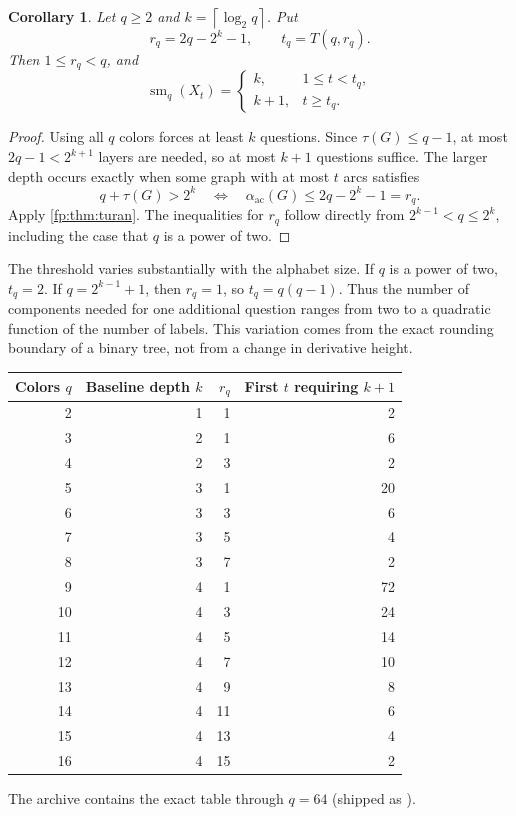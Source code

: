 \documentclass[11pt,letterpaper]{article}
\numberwithin{equation}{section}
\newtheorem{corollary}[corollary]{Corollary}
\theoremstyle{definition}
\theoremstyle{remark}
\theoremstyle{definition}
\newcommand{\sm}{\operatorname{sm}}
\newcommand{\ceil}[1]{\left\lceil#1\right\rceil}
\newcommand{\ac}{\alpha_{\mathrm{ac}}}
\begin{document}
\begin{corollary}\label{fp:cor:jump}
Let \(q\geq2\) and \(k=\ceil{\log_2q}\). Put
\[
 r_q=2q-2^k-1,\qquad t_q=T(q,r_q).
\]
Then \(1\leq r_q<q\), and
\begin{equation}\label{fp:eq:jump}
 \sm_q(X_t)=
 \begin{cases}
 k,&1\leq t<t_q,\\
 k+1,&t\geq t_q.
 \end{cases}
\end{equation}
\end{corollary}
\begin{proof}
Using all \(q\) colors forces at least \(k\) questions. Since
\(\tau(G)\leq q-1\), at most \(2q-1<2^{k+1}\) layers are needed,
so at most \(k+1\) questions suffice. The larger depth occurs exactly
when some graph with at most \(t\) arcs satisfies
\[
 q+\tau(G)>2^k
 \quad\Longleftrightarrow\quad
 \ac(G)\leq2q-2^k-1=r_q.
\]
Apply \cref{fp:thm:turan}. The inequalities for \(r_q\) follow directly
from \(2^{k-1}<q\leq2^k\), including the case that \(q\) is a power
of two.
\end{proof}

The threshold varies substantially with the alphabet size. If \(q\) is a
power of two, \(t_q=2\). If \(q=2^{k-1}+1\), then \(r_q=1\), so
\(t_q=q(q-1)\). Thus the number of components needed for one additional
question ranges from two to a quadratic function of the number of labels.
This variation comes from the exact rounding boundary of a binary tree,
not from a change in derivative height.

\begin{center}
\begin{tabular}{@{}rrrr@{}}
\toprule
Colors \(q\)&Baseline depth \(k\)&\(r_q\)&First \(t\) requiring \(k+1\)\\
\midrule
2&1&1&2\\
3&2&1&6\\
4&2&3&2\\
5&3&1&20\\
6&3&3&6\\
7&3&5&4\\
8&3&7&2\\
9&4&1&72\\
10&4&3&24\\
11&4&5&14\\
12&4&7&10\\
13&4&9&8\\
14&4&11&6\\
15&4&13&4\\
16&4&15&2\\
\bottomrule
\end{tabular}
\end{center}
The archive contains the exact table through \(q=64\)
(shipped as ).
\end{document}
